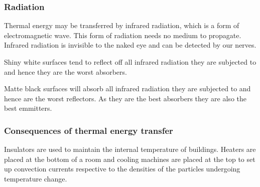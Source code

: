\subsubsection{Radiation}

Thermal energy may be transferred by infrared radiation, which is a form of electromagnetic wave.
This form of radiation needs no medium to propagate. Infrared radiation is invisible to the naked
eye and can be detected by our nerves.

Shiny white surfaces tend to reflect off all infrared radiation they are subjected to and hence
they are the worst absorbers.

Matte black surfaces will absorb all infrared radiation they are subjected to and hence are the
worst reflectors. As they are the best absorbers they are also the best emmitters.

\subsubsection{Consequences of thermal energy transfer}

Insulators are used to maintain the internal temperature of buildings. Heaters are placed at the
bottom of a room and cooling machines are placed at the top to set up convection currents
respective to the densities of the particles undergoing temperature change.
